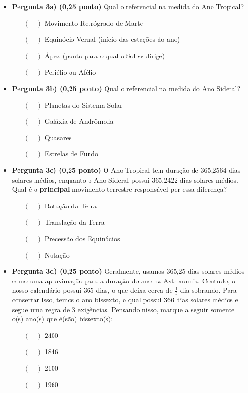 \documentclass[a4paper, 12pt]{article}
\begin{document}
\begin{flushleft}
\begin{itemize}
			\begin{itemize}
				\item \textbf{Pergunta 3a) (0,25 ponto)} Qual o referencial na medida do Ano Tropical?
					\begin{itemize}
						\item[$(\quad)$] Movimento Retrógrado de Marte
						\item[$(\quad)$] Equinócio Vernal (início das estações do ano)
						\item[$(\quad)$] Ápex (ponto para o qual o Sol se dirige)
						\item[$(\quad)$] Periélio ou Afélio
					\end{itemize}
				\item \textbf{Pergunta 3b) (0,25 ponto)} Qual o referencial na medida do Ano Sideral?
					\begin{itemize}
						\item[$(\quad)$] Planetas do Sistema Solar
						\item[$(\quad)$] Galáxia de Andrômeda
						\item[$(\quad)$] Quasares
						\item[$(\quad)$] Estrelas de Fundo
					\end{itemize}
				\item \textbf{Pergunta 3c) (0,25 ponto)} O Ano Tropical tem duração de 365,2564 dias solares médios, enquanto o Ano Sideral possui 365,2422 dias solares médios. Qual é o \textbf{principal} movimento terrestre responsável por essa diferença?
					\begin{itemize}
						\item[$(\quad)$] Rotação da Terra
						\item[$(\quad)$] Translação da Terra
						\item[$(\quad)$] Precessão dos Equinócios
						\item[$(\quad)$] Nutação
					\end{itemize}
				\item \textbf{Pergunta 3d) (0,25 ponto)} Geralmente, usamos 365,25 dias solares médios como uma aproximação para a duração do ano na Astronomia. Contudo, o nosso calendário possui 365 dias, o que deixa cerca de $\frac{1}{4}$ dia sobrando. Para consertar isso, temos o ano bissexto, o qual possui 366 dias solares médios e segue uma regra de 3 exigências. Pensando nisso, marque a seguir somente o(s) ano(s) que é(são) bissexto(s):
					\begin{itemize}
						\item[$(\quad)$] 2400
						\item[$(\quad)$] 1846
						\item[$(\quad)$] 2100
						\item[$(\quad)$] 1960
					\end{itemize}
			\end{itemize}
		

\end{itemize}
\end{flushleft}
\end{document}
